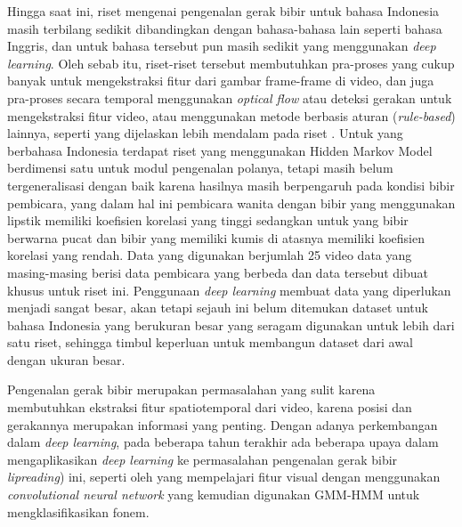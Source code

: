 Hingga saat ini, riset mengenai pengenalan gerak bibir untuk bahasa Indonesia masih terbilang sedikit dibandingkan dengan bahasa-bahasa lain seperti bahasa Inggris, dan untuk bahasa tersebut pun masih sedikit yang menggunakan \textit{deep learning}. Oleh sebab itu, riset-riset tersebut membutuhkan pra-proses yang cukup banyak untuk mengekstraksi fitur dari gambar frame-frame di video, dan juga pra-proses secara temporal menggunakan \textit{optical flow} atau deteksi gerakan untuk mengekstraksi fitur video, atau menggunakan metode berbasis aturan (\textit{rule-based}) lainnya, seperti yang dijelaskan lebih mendalam pada riset \textcite{Zhou2014}. Untuk yang berbahasa Indonesia terdapat riset \textcite{Achmad2015} yang menggunakan Hidden Markov Model berdimensi satu untuk modul pengenalan polanya, tetapi masih belum tergeneralisasi dengan baik karena hasilnya masih berpengaruh pada kondisi bibir pembicara, yang dalam hal ini pembicara wanita dengan bibir yang menggunakan lipstik memiliki koefisien korelasi yang tinggi sedangkan untuk yang bibir berwarna pucat dan bibir yang memiliki kumis di atasnya memiliki koefisien korelasi yang rendah. Data yang digunakan berjumlah 25 video data yang masing-masing berisi data pembicara yang berbeda dan data tersebut dibuat khusus untuk riset ini. Penggunaan \textit{deep learning} membuat data yang diperlukan menjadi sangat besar, akan tetapi sejauh ini belum ditemukan dataset untuk bahasa Indonesia yang berukuran besar yang seragam digunakan untuk lebih dari satu riset, sehingga timbul keperluan untuk membangun dataset dari awal dengan ukuran besar.
\bigskip

Pengenalan gerak bibir merupakan permasalahan yang sulit karena membutuhkan ekstraksi fitur spatiotemporal dari video, karena posisi dan gerakannya merupakan informasi yang penting. Dengan adanya perkembangan dalam \textit{deep learning}, pada beberapa tahun terakhir ada beberapa upaya dalam mengaplikasikan \textit{deep learning} ke permasalahan pengenalan gerak bibir \textit{lipreading}) ini, seperti oleh \textcite{Noda2014} yang mempelajari fitur visual dengan menggunakan \textit{convolutional neural network} yang kemudian digunakan GMM-HMM untuk mengklasifikasikan fonem.
\bigskip


